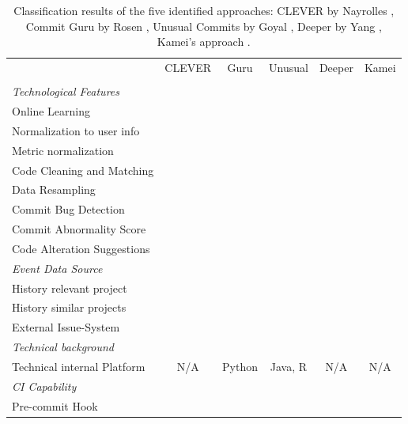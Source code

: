 \begin{table}[p]
	\centering
	\caption{Classification results of the five identified approaches: CLEVER by Nayrolles \cite{Nayrolles2018}, Commit Guru by Rosen \cite{Rosen2015}, Unusual Commits by Goyal \cite{Goyal2017}, Deeper by Yang \cite{Yang2015}, Kamei's approach \cite{Kamei2013}.}
	\begin{tabular}{@{}lccccc@{}}
		\toprule
		& CLEVER & Guru & Unusual & Deeper & Kamei \\ 
		& \cite{Nayrolles2018} & \cite{Rosen2015} & \cite{Goyal2017} & \cite{Yang2015} & \cite{Kamei2013} \\ \midrule
		\textit{Technological Features} & & & & & \\ 
		Online Learning & \pointyes & \pointyes & \pointyes & \pointno & \pointno \\
		Normalization to user info & \pointno & \pointno & \pointyes & \pointno & \pointno \\
		Metric normalization & \pnotapplicable & \pnotapplicable & \pointyes & \pointyes & \pointyes \\
		Code Cleaning and Matching & \pointyes & \pointno & \pointno & \pointno & \pointno \\
		Data Resampling & \pnotapplicable & \pnotapplicable & \pointno & \pointyes & \pointyes \\
		Commit Bug Detection & \pointyes & \pointyes & \pointno & \pointyes & \pointyes \\
		Commit Abnormality Score & \pointno & \pointno & \pointyes & \pointno & \pointno \\
		Code Alteration Suggestions & \pointyes & \pointno & \pointno & \pointno & \pointno \\ \midrule
		\textit{Event Data Source} & & & & & \\
		History relevant project & \pointyes & \pointyes & \pointyes & \pointyes & \pointyes \\
		History similar projects & \pointyes & \pointno & \pointno & \pointno & \pointno \\
		External Issue-System & \pointyes & \pointno & \pointno & \pointyes & \pointyes \\ \midrule
		\textit{Technical background} & & & & & \\
		Technical internal Platform & N/A & Python & Java, R & N/A & N/A \\ \midrule
		\textit{CI Capability} & & & & & \\
		Pre-commit Hook & \pointyes & \pointno & \pointno & \pnotapplicable & \pnotapplicable \\

\end{tabular}
\end{table}
